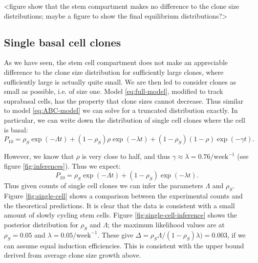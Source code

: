 \documentclass[10pt,UKenglish]{article}
\begin{document}
<figure show that the stem compartment makes no difference to the clone size distributions; maybe a figure to show the final equilibrium distributions?>

\subsection{\label{sec:single-cells}Single basal cell clones}

As we have seen, the stem cell compartment does not make an appreciable difference to the clone size distribution for sufficiently large clones, where sufficiently large is actually quite small. We are then led to consider clones as small as possible, i.e. of size one. Model \ref{eq:full-model}, modified to track suprabasal cells, has the property that clone sizes cannot decrease. Thus similar to model \ref{eq:ABC-model} we can solve for a truncated distribution exactly. In particular, we can write down the distribution of single cell clones where the cell is basal:
\begin{equation*}
P_{10} = \rho_S \exp(-\Lambda t) + (1-\rho_S) \rho \exp(-\lambda t) + (1-\rho_S) (1-\rho) \exp(-\gamma t).
\end{equation*}

However, we know that $\rho$ is very close to half, and thus $\gamma \approx \lambda = 0.76/\textrm{week}^{-1}$ (see figure \ref{fig:inferences}). Thus we expect: 
\begin{equation*}
P_{10} = \rho_S \exp(-\Lambda t) + (1-\rho_S) \exp(-\lambda t).
\end{equation*}
Thus given counts of single cell clones we can infer the parameters $\Lambda$ and $\rho_S$. Figure \ref{fig:single-cell} shows a comparison between the experimental counts and the theoretical predictions. It is clear that the data is consistent with a small amount of slowly cycling stem cells. Figure \ref{fig:single-cell-inference} shows the posterior distribution for $\rho_S$ and $\Lambda$; the maximum likelihood values are at $\rho_S = 0.05$ and $\lambda = 0.05/\textrm{week}^{-1}$. These give $\Delta = \rho_S \Lambda / (1-\rho_S) \lambda) = 0.003$, if we can assume equal induction efficiencies. This is consistent with the upper bound derived from average clone size growth above.
\end{document}
